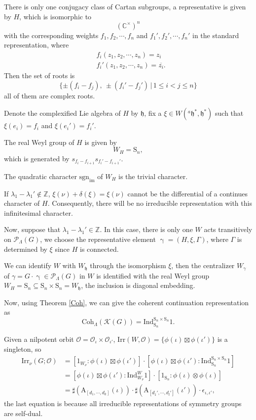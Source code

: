 \documentclass[12pt, a4paper]{amsart}
\numberwithin{equation}{section}
\newcommand{\BC}{{\mathbb {C}}}
\newcommand{\BZ}{{\mathbb {Z}}}
\newcommand{\CK}{{\mathcal {K}}}
\newcommand{\CO}{{\mathcal {O}}}
\newcommand{\CP}{{\mathcal {P}}}
\newcommand{\fh}{\mathfrak{h}}
\newcommand{\A}{{\mathrm{A}}}
\newcommand{\Ind}{{\mathrm{Ind}}}
\newcommand{\Irr}{{\mathrm{Irr}}}
\newcommand{\sgn}{{\mathrm{sgn}}}
\newcommand{\set}[2]{\{#1\,|\,#2\}}
\renewcommand{\bar}{\overline}
\begin{document}
There is only one conjugacy class of Cartan subgroups, a representative is given by $H$, which is isomorphic to
$$(\BC^\times)^n$$
with the corresponding weights $f_1,f_2,\cdots,f_n$ and $f_1',f_2',\cdots,f_n'$ in the standard representation, where
\begin{align}
    & f_i(z_1,z_2,\cdots,z_n) = z_i\\
    & f_i'(z_1,z_2,\cdots,z_n) = \bar{z_i}.
\end{align}
Then the set of roots is 
$$\set{\pm(f_i - f_j), \ \pm(f_i'-f_j')}{1\leq i< j \leq n}$$
all of them are complex roots.

Denote the complexified Lie algebra of $H$ by $\fh$, fix a $\xi \in W({^{a}\fh^*},\fh^*)$ such that $\xi(e_i) = f_i$ and $\xi(e_i') = f_i'$.

The real Weyl group of $H$ is given by
$$W_H = \mathrm{S}_n,$$
which is generated by $s_{f_i-f_{i+1}}s_{f_i'-f_{i+1}'}$. 

The quadratic character $\sgn_{\mathrm{im}}$ of $W_{H}$ is the trivial character.

If $\lambda_1 - \lambda_1' \notin \BZ$, $\xi(\nu) + \delta(\xi) = \xi(\nu)$ cannot be the differential of a continues character of $H$. Consequently, there will be no irreducible representation with this infinitesimal character.  

Now, suppose that $\lambda_1 - \lambda_1' \in \BZ$. In this case, there is only one $W$ acts transitively on $\CP_{\Lambda}(G)$, we choose the representative element $\upgamma = (H,\xi, \Gamma)$, where $\Gamma$ is determined by $\xi$ since $H$ is connected.

We can identify $W$ with $W_\fh$ through the isomorphism $\xi$, then the centralizer $W_{{\gamma}}$ of ${\gamma} = G \cdot \upgamma \in \CP_{\Lambda}(G)$ in $W$ is identified with the real Weyl group $W_{H} = \mathrm{S}_n \subseteq \mathrm{S}_n \times \mathrm{S}_n = W_{\fh}$, the inclusion is diagonal embedding.

Now, using Theorem \ref{Coh}, we can give the coherent continuation representation as 
\begin{equation}
    \mathrm{Coh}_{\Lambda}(\CK(G)) = \Ind^{\mathrm{S}_n \times \mathrm{S}_n}_{\mathrm{S}_n}1.
\end{equation}

Given a nilpotent orbit $\CO = \CO_{\iota} \times \CO_{\iota'}$, $\Irr(W,\CO) = \{\phi(\iota) \boxtimes \phi(\iota')\}$ is a singleton, so
\begin{align}
    \Irr_{\nu}(G;\CO) & = [1_{W_\nu}:\phi(\iota) \boxtimes \phi(\iota')]\cdot[\phi(\iota)\boxtimes \phi(\iota'):\Ind^{\mathrm{S}_n \times \mathrm{S}_n}_{\mathrm{S}_n}1]\\
    & = [\phi(\iota)\boxtimes \phi(\iota'):\Ind_{W_\nu}^{W}1] \cdot [1_{\mathrm{S}_n}:\phi(\iota) \otimes \phi(\iota)]\\
    & = \sharp(\A_{[d_1,\cdots,d_k]}(\iota)) \cdot \sharp(\A_{[d_1',\cdots,d_l']}(\iota')) \cdot \epsilon_{\iota,\iota'},
\end{align}
the last equation is because all irreducible representations of symmetry groups are self-dual.
\end{document}
